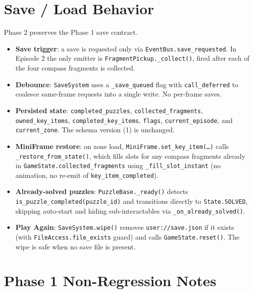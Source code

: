 \documentclass[12pt, a4paper]{article}
\begin{document}
\section{Save / Load Behavior}

Phase 2 preserves the Phase 1 save contract.

\begin{itemize}[nosep]
  \item \textbf{Save trigger}: a save is requested only via
        \texttt{EventBus.save\_requested}. In Episode 2 the only emitter is
        \texttt{FragmentPickup.\_collect()}, fired after each of the four
        compass fragments is collected.
  \item \textbf{Debounce}: \texttt{SaveSystem} uses a \texttt{\_save\_queued}
        flag with \texttt{call\_deferred} to coalesce same-frame requests
        into a single write. No per-frame saves.
  \item \textbf{Persisted state}: \texttt{completed\_puzzles},
        \texttt{collected\_fragments}, \texttt{owned\_key\_items},
        \texttt{completed\_key\_items}, \texttt{flags},
        \texttt{current\_episode}, and \texttt{current\_zone}. The schema
        version (1) is unchanged.
  \item \textbf{MiniFrame restore}: on zone load,
        \texttt{MiniFrame.set\_key\_item(\dots)} calls
        \texttt{\_restore\_from\_state()}, which fills slots for any compass
        fragments already in \texttt{GameState.collected\_fragments} using
        \texttt{\_fill\_slot\_instant} (no animation, no re-emit of
        \texttt{key\_item\_completed}).
  \item \textbf{Already-solved puzzles}: \texttt{PuzzleBase.\_ready()}
        detects \texttt{is\_puzzle\_completed(puzzle\_id)} and transitions
        directly to \texttt{State.SOLVED}, skipping auto-start and hiding
        sub-interactables via \texttt{\_on\_already\_solved()}.
  \item \textbf{Play Again}: \texttt{SaveSystem.wipe()} removes
        \texttt{user://save.json} if it exists (with
        \texttt{FileAccess.file\_exists} guard) and calls
        \texttt{GameState.reset()}. The wipe is safe when no save file is
        present.
\end{itemize}

\section{Phase 1 Non-Regression Notes}
\end{document}
